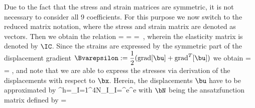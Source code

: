 Due to the fact that the stress and strain matrices are 
symmetric, it is not necessary to consider all 9 coefficients. 
For this purpose we now switch to the reduced matrix notation, 
where the stress and strain matrix are denoted as vectors. 
Then we obtain the relation 
%
\eb
\Bsigma = 
 = 
= \IC\,\Bvarepsilon , 
\label{elasticity}
\ee
%
wherein the elasticity matrix is denoted by $\IC$. 
Since the strains are expressed by the symmetric part of 
the displacement gradient 
$\Bvarepsilon := \dfrac{1}{2} (\mbox{grad}[\bu] + \mbox{grad}^T[\bu])$ 
we obtain 
%
\eb
\Bvarepsilon =
 =
  \left[ \begin{array}{c}
  u_{x,x}\\
  u_{y,y}\\
  u_{x,y}+u_{y,x}
\end{array} \right] , 
\label{gradu}
\ee
%
and note that we are able to express the stresses via 
derivation of the displacements with respect to $\bx$. 
Herein, the displacements $\bu$ have to be approximated by 
%
\eb
\bu^h=\sum_{I=1}^{4}N_I\bd_I=\bN^e\bd^e 
\ee
%
with $\bN$ being the ansatzfunction matrix defined by
%
\eb
\left[ \begin{array}{cc}
       u_x^h\\ u_y^h
       \end{array}\right]=
\left[ \begin{array}{cc|cc|cc|cc}
         N_{1} &0& N_2&0 &N_{3}&0&N_{4}&0 \\
         0& N_{1}& 0&N_{2}&0&N_{3}&0&N_{4} \\

\end{array} \right]
